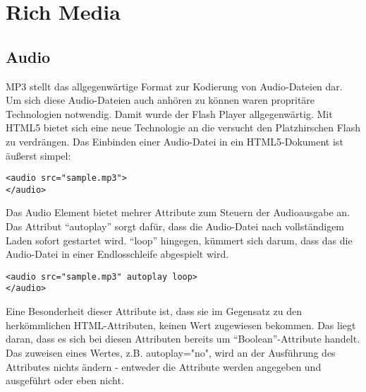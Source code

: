 %
%


\section{Rich Media}
\subsection{Audio}
MP3 stellt das allgegenwärtige Format zur Kodierung von Audio-Dateien dar. Um sich diese
Audio-Dateien auch anhören zu können waren propritäre Technologien notwendig. Damit
wurde der Flash Player allgegenwärtig.
\newline\newline
Mit HTML5 bietet sich eine neue Technologie an die versucht den Platzhirschen Flash zu
verdrängen.
Das Einbinden einer Audio-Datei in ein HTML5-Dokument ist äußerst simpel:
\begin{verbatim}
<audio src="sample.mp3">
</audio>
\end{verbatim}
Das Audio Element bietet mehrer Attribute zum Steuern der Audioausgabe an.
Das Attribut ``autoplay'' sorgt dafür, dass die Audio-Datei nach vollständigem Laden
sofort gestartet wird. ``loop'' hingegen, kümmert sich darum, dass das die Audio-Datei
in einer Endlosschleife abgespielt wird.
\begin{verbatim}
<audio src="sample.mp3" autoplay loop>
</audio>
\end{verbatim}
Eine Besonderheit dieser Attribute ist, dass sie im Gegensatz zu den herkömmlichen HTML-Attributen,
keinen Wert zugewiesen bekommen. Das liegt daran, dass es sich bei diesen Attributen bereits um
``Boolean''-Attribute handelt. Das zuweisen eines Wertes, z.B. autoplay="no", wird an der Ausführung
des Attributes nichts ändern - entweder die Attribute werden angegeben und ausgeführt oder
eben nicht.

